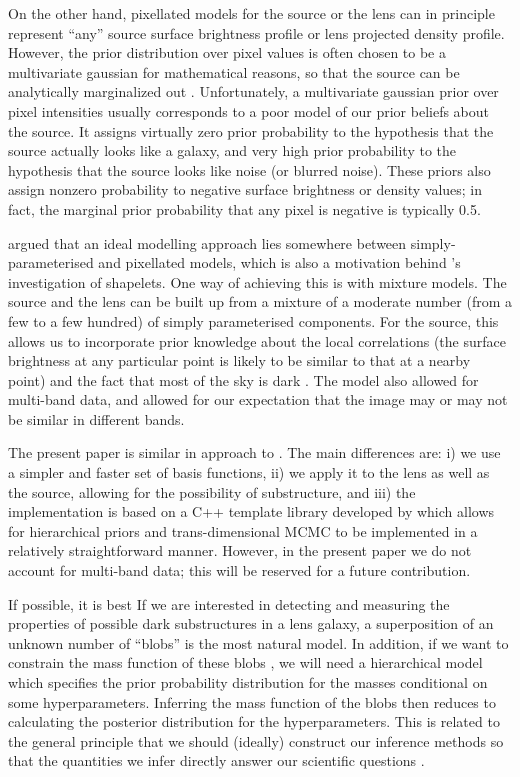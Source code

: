 \documentclass[useAMS,usenatbib]{mn2e}
\begin{document}
On the
other hand, pixellated models for the source \citep[e.g.][]{suyu} or the lens
\citep[e.g.][]{2014MNRAS.445.2181C} can in principle represent ``any''
source surface brightness profile or lens projected density profile. However, the prior
distribution over pixel values is often chosen to be a multivariate gaussian
for mathematical reasons, so
that the source can be analytically marginalized out
\citep{2003ApJ...590..673W}. Unfortunately, a multivariate gaussian prior
over pixel intensities usually corresponds to a poor model of our prior
beliefs about the source. It assigns virtually zero prior probability
to the hypothesis that the source actually looks like a galaxy, and very high
prior probability to the hypothesis that the source looks like noise (or
blurred noise). These priors also assign nonzero probability to negative
surface brightness or density values; in fact, the marginal prior probability
that any pixel is negative is typically 0.5.

\citet{2011MNRAS.412.2521B} argued that an ideal
modelling approach lies somewhere between simply-parameterised and
pixellated models, which is also a motivation behind
\citet{2015arXiv150500198T}'s investigation of shapelets.
One way of achieving this is with mixture models.
The source and the lens can be built up from a mixture of a moderate
number (from a few to a few hundred) of
simply parameterised components. For the source, this allows
us to incorporate prior knowledge about the local correlations (the surface
brightness at any particular point is likely to be similar to that at a
nearby point) and the fact that most of the sky is
dark \citep{2006ApJ...637..608B}. The \citet{2011MNRAS.412.2521B} model also
allowed for multi-band data, and allowed for our expectation that the image
may or may not be similar in different bands.

The present paper is similar in approach to \citet{2011MNRAS.412.2521B}.
The main differences are:
i) we use a simpler and faster set of basis functions,
ii) we apply it to the lens as well as the source, allowing for the
possibility of substructure, and
iii) the implementation is based on a C++ template library developed by
\citet{rjobject} which allows for hierarchical priors and trans-dimensional
MCMC to be implemented in a relatively straightforward manner.
However, in the present paper we do not account for
multi-band data; this will be reserved for a future contribution.

If possible, it is best
If we are interested in detecting and measuring the properties of
possible dark substructures in a lens galaxy,
a superposition of an unknown number of ``blobs'' is the
most natural model. In addition, if we want to constrain the mass function of
these blobs \citep[e.g.][]{2009MNRAS.400.1583V, 2014MNRAS.442.2017V},
we will need a hierarchical model which specifies the prior probability
distribution for the masses conditional on some hyperparameters. Inferring the
mass function of the blobs then reduces to calculating the posterior
distribution for the hyperparameters. This is related to the general principle
that we should (ideally) construct our inference methods so that the
quantities we infer directly answer our scientific questions
\citep{2015arXiv150507840A, 2015ApJ...807...87S, pancoast}.
\end{document}
